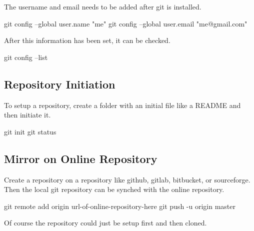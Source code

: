\documentclass[]{book}
\newenvironment{Shaded}{\begin{snugshade}}{\end{snugshade}}
\newcommand{\StringTok}[1]{\textcolor[rgb]{0.31,0.60,0.02}{#1}}
\newcommand{\FunctionTok}[1]{\textcolor[rgb]{0.00,0.00,0.00}{#1}}
\newcommand{\NormalTok}[1]{#1}
\begin{document}
The username and email needs to be added after git is installed.

\begin{Shaded}
\begin{Highlighting}[]
\FunctionTok{git}\NormalTok{ config --global user.name }\StringTok{"me"}
\FunctionTok{git}\NormalTok{ config --global user.email }\StringTok{"me@gmail.com"}
\end{Highlighting}
\end{Shaded}

After this information has been set, it can be checked.

\begin{Shaded}
\begin{Highlighting}[]
\FunctionTok{git}\NormalTok{ config --list}
\end{Highlighting}
\end{Shaded}

\subsection{Repository Initiation}\label{repository-initiation}

To setup a repository, create a folder with an initial file like a
README and then initiate it.

\begin{Shaded}
\begin{Highlighting}[]
\FunctionTok{git}\NormalTok{ init}
\FunctionTok{git}\NormalTok{ status}
\end{Highlighting}
\end{Shaded}

\subsection{Mirror on Online
Repository}\label{mirror-on-online-repository}

Create a repository on a repository like github, gitlab, bitbucket, or
sourceforge. Then the local git repository can be synched with the
online repository.

\begin{Shaded}
\begin{Highlighting}[]
\FunctionTok{git}\NormalTok{ remote add origin url-of-online-repository-here}
\FunctionTok{git}\NormalTok{ push -u origin master}
\end{Highlighting}
\end{Shaded}

Of course the repository could just be setup first and then cloned.
\end{document}
